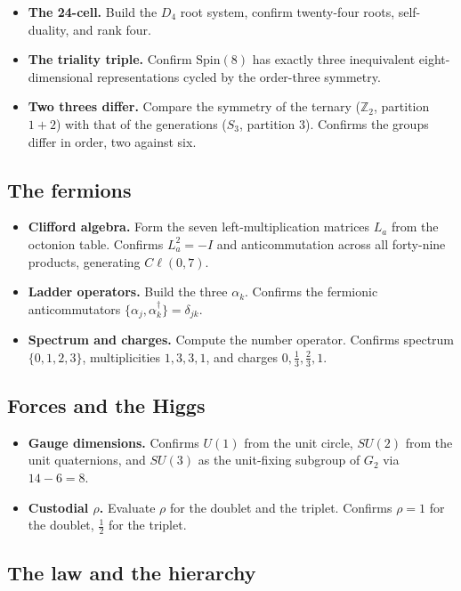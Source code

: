 \begin{itemize}
  \item \textbf{The 24-cell.} Build the $D_4$ root system, confirm twenty-four roots, self-duality, and rank four.
  \item \textbf{The triality triple.} Confirm $\mathrm{Spin}(8)$ has exactly three inequivalent eight-dimensional
  representations cycled by the order-three symmetry.
  \item \textbf{Two threes differ.} Compare the symmetry of the ternary ($\mathbb{Z}_2$, partition $1+2$) with that of
  the generations ($S_3$, partition $3$). Confirms the groups differ in order, two against six.
\end{itemize}

\subsection*{The fermions}

\begin{itemize}
  \item \textbf{Clifford algebra.} Form the seven left-multiplication matrices $L_a$ from the octonion table. Confirms
  $L_a^2 = -I$ and anticommutation across all forty-nine products, generating $C\ell(0,7)$.
  \item \textbf{Ladder operators.} Build the three $\alpha_k$. Confirms the fermionic anticommutators
  $\{\alpha_j, \alpha_k^\dagger\} = \delta_{jk}$.
  \item \textbf{Spectrum and charges.} Compute the number operator. Confirms spectrum $\{0,1,2,3\}$, multiplicities
  $1,3,3,1$, and charges $0, \tfrac13, \tfrac23, 1$.
\end{itemize}

\subsection*{Forces and the Higgs}

\begin{itemize}
  \item \textbf{Gauge dimensions.} Confirms $U(1)$ from the unit circle, $SU(2)$ from the unit quaternions, and
  $SU(3)$ as the unit-fixing subgroup of $G_2$ via $14 - 6 = 8$.
  \item \textbf{Custodial $\rho$.} Evaluate $\rho$ for the doublet and the triplet. Confirms $\rho = 1$ for the doublet,
  $\tfrac12$ for the triplet.
\end{itemize}

\subsection*{The law and the hierarchy}

